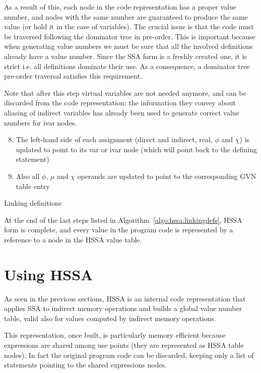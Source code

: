 As a result of this, each node in the code representation has a proper value number, and nodes with the same number are guaranteed to produce the same value (or hold it in the case of variables).
The crucial issue is that the code must be traversed following the dominator tree in pre-order. This is important because when generating value numbers we must be sure that all the involved definitions already have a value number. Since the SSA form is a freshly created one, it is strict i.e. all definitions dominate their use. As a consequence, a dominator tree pre-order traversal satisfies this requirement.

Note that after this step virtual variables are not needed anymore, and can be discarded from the code representation: the information they convey about aliasing of indirect variables has already been used to generate correct value numbers for ivar nodes.

\begin{algorithm}[H]
\begin{enumerate}
\setcounter{enumi}{7}
  \item The left-hand side of each assignment (direct and indirect, real, $\phi$ and $\chi$) is updated to point to its var or ivar node (which will point back to the defining statement)
  \item Also all $\phi$, $\mu$ and $\chi$ operands are updated to point to the corresponding GVN table entry
\end{enumerate}
\caption{\label{algo:hssa:linkingdefs}Linking definitions}
\end{algorithm}

At the end of the last steps listed in Algorithm~\ref{algo:hssa:linkingdefs}, HSSA form is complete, and every value in the program code is represented by a reference to a node in the HSSA value table.

\section{Using HSSA}
As seen in the previous sections, HSSA is an internal code representation that applies SSA to indirect memory operations and builds a global value number table, valid also for values computed by indirect memory operations.


This representation, once built, is particularly memory efficient because expressions are shared among use points (they are represented as HSSA table nodes). In fact the original program code can be discarded, keeping only a list of statements pointing to the shared expressions nodes.

